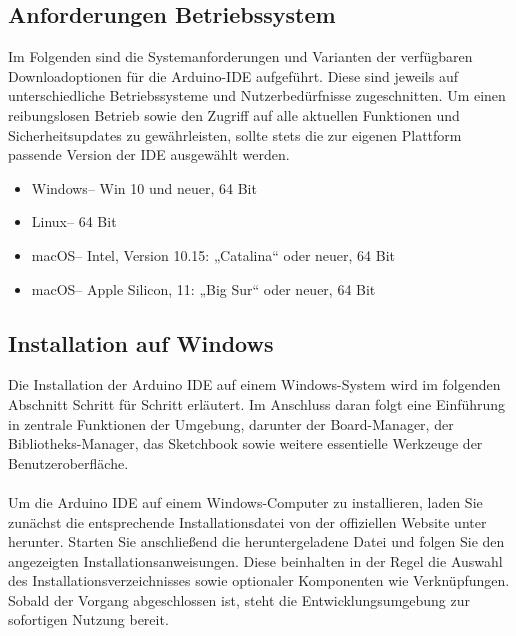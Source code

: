\subsection{Anforderungen Betriebssystem} 
Im Folgenden sind die Systemanforderungen und Varianten der verfügbaren Downloadoptionen für die Arduino-IDE aufgeführt. Diese sind jeweils auf unterschiedliche Betriebssysteme und Nutzerbedürfnisse zugeschnitten. Um einen reibungslosen Betrieb sowie den Zugriff auf alle aktuellen Funktionen und Sicherheitsupdates zu gewährleisten, sollte stets die zur eigenen Plattform passende Version der IDE ausgewählt werden. 

\begin{itemize} 
	
	
	\item Windows– Win 10 und neuer, 64 Bit\\ 
	
	\item Linux– 64 Bit\\ 
	
	\item macOS– Intel, Version 10.15: „Catalina“ oder neuer, 64 Bit\\ 
	
	\item macOS– Apple Silicon, 11: „Big Sur“ oder neuer, 64 Bit\\ 
	
	
\end{itemize} 



\subsection{Installation auf Windows} 
Die Installation der Arduino IDE auf einem Windows-System wird im folgenden Abschnitt Schritt für Schritt erläutert. Im Anschluss daran folgt eine Einführung in zentrale Funktionen der Umgebung, darunter der Board-Manager, der Bibliotheks-Manager, das Sketchbook sowie weitere essentielle Werkzeuge der Benutzeroberfläche. 
\\\\ 
Um die Arduino IDE auf einem Windows-Computer zu installieren, laden Sie zunächst die entsprechende Installationsdatei von der offiziellen Website unter  herunter. Starten Sie anschlie\ss end die heruntergeladene Datei und folgen Sie den angezeigten Installationsanweisungen. Diese beinhalten in der Regel die Auswahl des Installationsverzeichnisses sowie optionaler Komponenten wie Verknüpfungen. Sobald der Vorgang abgeschlossen ist, steht die Entwicklungsumgebung zur sofortigen Nutzung bereit. 


